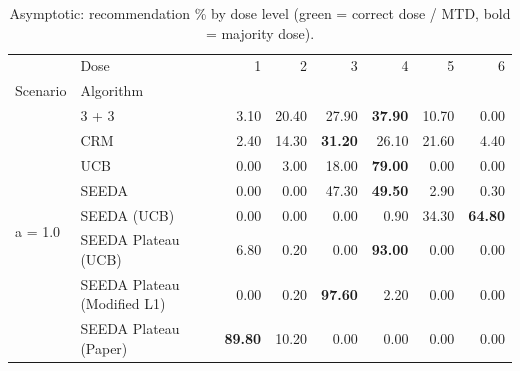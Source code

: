 \begin{table}[H]
\centering
\caption{Asymptotic: recommendation \% by dose level (green = correct dose / MTD, bold = majority dose).}
\label{tab:asym_rec_by_dose}
\begin{tabular}{llrrrrrr}
\toprule
 & Dose & 1 & 2 & 3 & 4 & 5 & 6 \\
Scenario & Algorithm &  &  &  &  &  &  \\
\midrule
\multirow[c]{8}{*}{a = 1.0} & 3 + 3 & 3.10 & 20.40 & {\cellcolor[HTML]{C8E6C9}} 27.90 & \bfseries 37.90 & 10.70 & 0.00 \\
 & CRM & 2.40 & 14.30 & {\cellcolor[HTML]{C8E6C9}} \bfseries 31.20 & 26.10 & 21.60 & 4.40 \\
 & UCB & 0.00 & 3.00 & {\cellcolor[HTML]{C8E6C9}} 18.00 & \bfseries 79.00 & 0.00 & 0.00 \\
 & SEEDA & 0.00 & 0.00 & {\cellcolor[HTML]{C8E6C9}} 47.30 & \bfseries 49.50 & 2.90 & 0.30 \\
 & SEEDA (UCB) & 0.00 & 0.00 & {\cellcolor[HTML]{C8E6C9}} 0.00 & 0.90 & 34.30 & \bfseries 64.80 \\
 & SEEDA Plateau (UCB) & 6.80 & 0.20 & {\cellcolor[HTML]{C8E6C9}} 0.00 & \bfseries 93.00 & 0.00 & 0.00 \\
 & SEEDA Plateau (Modified L1) & 0.00 & 0.20 & {\cellcolor[HTML]{C8E6C9}} \bfseries 97.60 & 2.20 & 0.00 & 0.00 \\
 & SEEDA Plateau (Paper) & \bfseries 89.80 & 10.20 & {\cellcolor[HTML]{C8E6C9}} 0.00 & 0.00 & 0.00 & 0.00 \\
\bottomrule
\end{tabular}
\end{table}
